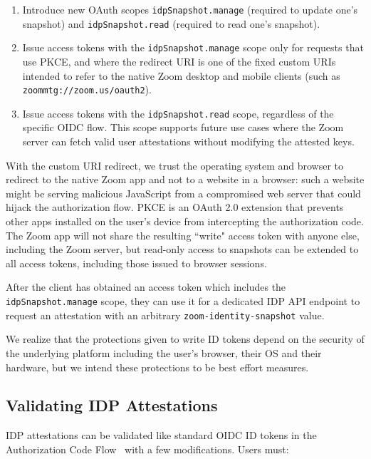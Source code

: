 \begin{enumerate}
\item Introduce new OAuth scopes \texttt{idpSnapshot.manage} (required
    to update one's snapshot) and \texttt{idpSnapshot.read} (required to
    read one's snapshot).
\item Issue access tokens with the \texttt{idpSnapshot.manage} scope only for requests that use
    PKCE, and where the redirect URI is one of the fixed custom URIs intended to refer to the native Zoom desktop and mobile clients (such as \texttt{zoommtg://zoom.us/oauth2}).
\item Issue access tokens with the \texttt{idpSnapshot.read} scope, regardless of the specific OIDC flow. This scope supports future use cases where the Zoom server can fetch valid user attestations without modifying the attested keys.
\end{enumerate}

With the custom URI redirect, we trust the operating system and browser to redirect to the native
Zoom app and not to a website in a browser: such a website might be serving malicious JavaScript
from a compromised web server that could hijack the authorization flow. PKCE is an OAuth 2.0
extension that prevents other apps installed on the user's device from intercepting the
authorization code. The Zoom app will not share the resulting ``write" access token with anyone
else, including the Zoom server, but read-only access to snapshots can be extended to all access
tokens, including those issued to browser sessions.

After the client has obtained an access token which includes the \texttt{idpSnapshot.manage} scope, they
can use it for a dedicated IDP API endpoint to request an attestation with an arbitrary
\texttt{zoom-identity-snapshot} value.

We realize that the protections given to write ID tokens depend on the security of the underlying
platform including the user's browser, their OS and their hardware, but we intend these protections
to be best effort measures.

\subsection{Validating IDP Attestations}\label{subsec:validateattestation}

IDP attestations can be validated like standard OIDC ID tokens in the Authorization Code
Flow~\cite{oidc} with a few modifications. Users must:


